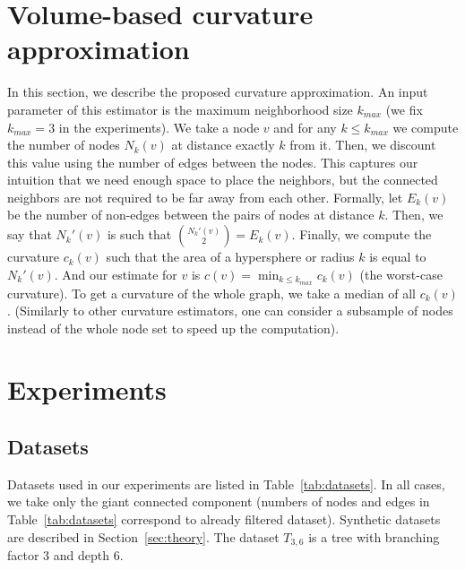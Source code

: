 \documentclass{article} %
\begin{document}
\section{Volume-based curvature approximation}\label{sec:new_curvature}

In this section, we describe the proposed curvature approximation. An input parameter of this estimator is the maximum neighborhood size $k_{max}$ (we fix $k_{max} = 3$ in the experiments). We take a node $v$ and for any $k \le k_{max}$ we compute the number of nodes $N_k(v)$ at distance exactly $k$ from it.
Then, we discount this value using the number of edges between the nodes.
This captures our intuition that we need enough space to place the neighbors, but the connected neighbors are not required to be far away from each other.
Formally, let $E_k(v)$ be the number of non-edges between the pairs of nodes at distance $k$. Then, we say that $N_k'(v)$ is such that ${N_k'(v) \choose 2} = E_k(v)$.  Finally, we compute the curvature $c_k(v)$ such that the area of a hypersphere or radius $k$ is equal to $N_k'(v)$. And our estimate for $v$ is $c(v) = \min_{k \le k_{max}} c_k(v)$ (the worst-case curvature). To get a curvature of the whole graph, we take a median of all $c_k(v)$. (Similarly to other curvature estimators, one can consider a subsample of nodes instead of the whole node set to speed up the computation).

\section{Experiments}

\subsection{Datasets}\label{sec:datasets}

Datasets used in our experiments are listed in Table~\ref{tab:datasets}. In all cases, we take only the giant connected component (numbers of nodes and edges in Table~\ref{tab:datasets} correspond to already filtered dataset). Synthetic datasets are described in Section~\ref{sec:theory}. The dataset $T_{3,6}$ is a tree with branching factor 3 and depth 6.
\end{document}
